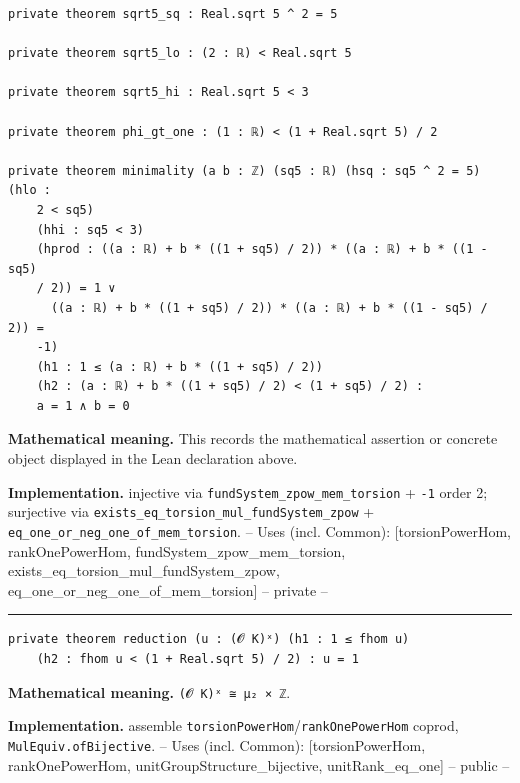 \documentclass[UTF8,a4paper,11pt,fontset=fandol]{ctexart}
\theoremstyle{definition}
\newcommand{\statementsep}{\par\medskip\hrule\medskip}
\begin{document}
\begin{verbatim}
private theorem sqrt5_sq : Real.sqrt 5 ^ 2 = 5

private theorem sqrt5_lo : (2 : ℝ) < Real.sqrt 5

private theorem sqrt5_hi : Real.sqrt 5 < 3

private theorem phi_gt_one : (1 : ℝ) < (1 + Real.sqrt 5) / 2

private theorem minimality (a b : ℤ) (sq5 : ℝ) (hsq : sq5 ^ 2 = 5) (hlo :
    2 < sq5)
    (hhi : sq5 < 3)
    (hprod : ((a : ℝ) + b * ((1 + sq5) / 2)) * ((a : ℝ) + b * ((1 - sq5)
    / 2)) = 1 ∨
      ((a : ℝ) + b * ((1 + sq5) / 2)) * ((a : ℝ) + b * ((1 - sq5) / 2)) =
    -1)
    (h1 : 1 ≤ (a : ℝ) + b * ((1 + sq5) / 2))
    (h2 : (a : ℝ) + b * ((1 + sq5) / 2) < (1 + sq5) / 2) :
    a = 1 ∧ b = 0
\end{verbatim}
\noindent\textbf{Mathematical meaning.} This records the mathematical assertion or concrete object displayed in the Lean declaration above.\par
\noindent\textbf{Implementation.} injective via \texttt{fundSystem\_\allowbreak{}zpow\_\allowbreak{}mem\_\allowbreak{}torsion} + \texttt{-1} order 2; surjective via \texttt{exists\_\allowbreak{}eq\_\allowbreak{}torsion\_\allowbreak{}mul\_\allowbreak{}fundSystem\_\allowbreak{}zpow} + \texttt{eq\_\allowbreak{}one\_\allowbreak{}or\_\allowbreak{}neg\_\allowbreak{}one\_\allowbreak{}of\_\allowbreak{}mem\_\allowbreak{}torsion}. -- Uses (incl. Common): [torsionPowerHom, rankOnePowerHom, fundSystem\_\allowbreak{}zpow\_\allowbreak{}mem\_\allowbreak{}torsion, exists\_\allowbreak{}eq\_\allowbreak{}torsion\_\allowbreak{}mul\_\allowbreak{}fundSystem\_\allowbreak{}zpow, eq\_\allowbreak{}one\_\allowbreak{}or\_\allowbreak{}neg\_\allowbreak{}one\_\allowbreak{}of\_\allowbreak{}mem\_\allowbreak{}torsion] -- private --\par
\statementsep
\begin{verbatim}
private theorem reduction (u : (𝓞 K)ˣ) (h1 : 1 ≤ fhom u)
    (h2 : fhom u < (1 + Real.sqrt 5) / 2) : u = 1
\end{verbatim}
\noindent\textbf{Mathematical meaning.} \texttt{(𝓞 K)ˣ ≅ μ₂ × ℤ}.\par
\noindent\textbf{Implementation.} assemble \texttt{torsionPowerHom}/\texttt{rankOnePowerHom} coprod, \texttt{MulEquiv.\allowbreak{}ofBijective}. -- Uses (incl. Common): [torsionPowerHom, rankOnePowerHom, unitGroupStructure\_\allowbreak{}bijective, unitRank\_\allowbreak{}eq\_\allowbreak{}one] -- public --\par
\end{document}
